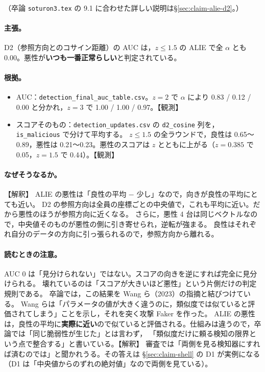 \documentclass[a4j, dvipdfmx]{jsarticle}  %
\begin{document}
（卒論 \texttt{soturon3.tex} の 9.1 に合わせた詳しい説明は\S\ref{sec:claim-alie-d2}。）

\paragraph{主張。}
D2（参照方向とのコサイン距離）の AUC は，$z \le 1.5$ の ALIE で全 $\alpha$ とも 0.00。悪性が\textbf{いつも一番正常らしい}と判定されている。

\paragraph{根拠。}
\begin{itemize}
  \item AUC：\texttt{detection\_final\_auc\_table.csv}。$z = 2$ で $\alpha$ により 0.83 / 0.12 / 0.00 と分かれ，$z = 3$ で 1.00 / 1.00 / 0.97。【観測】
  \item スコアそのもの：\texttt{detection\_updates.csv} の \texttt{d2\_cosine} 列を，\texttt{is\_malicious} で分けて平均する。
        $z \le 1.5$ の全ラウンドで，良性は 0.65〜0.89，悪性は 0.21〜0.23。悪性のスコアは $z$ とともに上がる（$z = 0.385$ で 0.05，$z = 1.5$ で 0.44）。【観測】
\end{itemize}

\paragraph{なぜそうなるか。}【解釈】
ALIE の悪性は「良性の平均 $-$ 少し」なので，向きが良性の平均にとても近い。
D2 の参照方向は全員の座標ごとの中央値で，これも平均に近い。だから悪性のほうが参照方向に近くなる。
さらに，悪性 4 台は同じベクトルなので，中央値そのものが悪性の側に引き寄せられ，逆転が強まる。
良性はそれぞれ自分のデータの方向に引っ張られるので，参照方向から離れる。

\paragraph{読むときの注意。}
AUC 0 は「見分けられない」ではない。スコアの向きを逆にすれば完全に見分けられる。
壊れているのは「スコアが大きいほど悪性」という片側だけの判定規則である。
卒論では，この結果を Wang ら（2023）の指摘と結びつけている。
Wang らは「パラメータの値が大きく違うのに，類似度では似ていると評価されてしまう」ことを示し，それを突く攻撃 Faker を作った。
ALIE の悪性は，良性の平均に\textbf{実際に近い}ので似ていると評価される。仕組みは違うので，卒論では「同じ脆弱性が生じた」とは言わず，
「類似度だけに頼る検知の限界という点で整合する」と書いている。【解釈】
審査では「両側を見る検知器にすれば済むのでは」と聞かれうる。その答えは \S\ref{sec:claim-shell} の D1 が実例になる（D1 は「中央値からのずれの絶対値」なので両側を見ている）。
\end{document}
